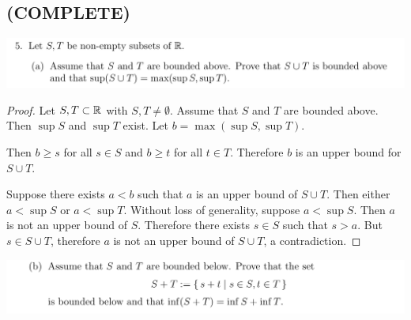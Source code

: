 \documentclass[12pt]{article}
\begin{document}
\newpage
\subsection{(COMPLETE)}
\begin{mdframed}
  \includegraphics[width=400pt]{img/oxford-M2-analysis-I-2-5-a.png}
\end{mdframed}

\begin{proof}
  Let $S, T \subset \mathbb{R}$ with $S, T \neq \emptyset$. Assume that $S$ and $T$ are bounded
  above. Then $\sup S$ and $\sup T$ exist. Let $b = \max(\sup S, \sup T)$.

  Then $b \geq s$ for all $s \in S$ and $b \geq t$ for all $t \in T$. Therefore $b$ is an upper
  bound for $S \cup T$.

  Suppose there exists $a < b$ such that $a$ is an upper bound of $S \cup T$. Then either
  $a < \sup S$ or $a < \sup T$. Without loss of generality, suppose $a < \sup S$. Then $a$ is not
  an upper bound of $S$. Therefore there exists $s \in S$ such that $s > a$. But
  $s \in S \cup T$, therefore $a$ is not an upper bound of $S \cup T$, a contradiction.
\end{proof}

\begin{mdframed}
  \includegraphics[width=400pt]{img/oxford-M2-analysis-I-2-5-b.png}
\end{mdframed}
\end{document}
